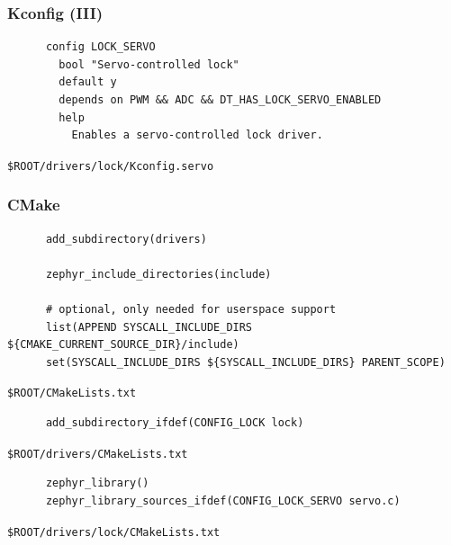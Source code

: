 \documentclass[handout]{beamer}
\begin{document}
\begin{frame}[fragile]
  \frametitle{Kconfig (III)}
  \begin{listing}[H]
    \begin{verbatim}
      config LOCK_SERVO
        bool "Servo-controlled lock"
        default y
        depends on PWM && ADC && DT_HAS_LOCK_SERVO_ENABLED
        help
          Enables a servo-controlled lock driver.

    \end{verbatim}
    \caption{\texttt{\$ROOT/drivers/lock/Kconfig.servo}}
  \end{listing}
\end{frame}

\begin{frame}[fragile]
  \frametitle{CMake}

  \begin{listing}[H]
    \begin{verbatim}
      add_subdirectory(drivers)

      zephyr_include_directories(include)

      # optional, only needed for userspace support
      list(APPEND SYSCALL_INCLUDE_DIRS ${CMAKE_CURRENT_SOURCE_DIR}/include)
      set(SYSCALL_INCLUDE_DIRS ${SYSCALL_INCLUDE_DIRS} PARENT_SCOPE)
    \end{verbatim}
    \caption{\texttt{\$ROOT/CMakeLists.txt}}
  \end{listing}

  \begin{listing}[H]
    \begin{verbatim}
      add_subdirectory_ifdef(CONFIG_LOCK lock)
    \end{verbatim}
    \caption{\texttt{\$ROOT/drivers/CMakeLists.txt}}
  \end{listing}

  \begin{listing}[H]
    \begin{verbatim}
      zephyr_library()
      zephyr_library_sources_ifdef(CONFIG_LOCK_SERVO servo.c)
    \end{verbatim}
    \caption{\texttt{\$ROOT/drivers/lock/CMakeLists.txt}}
  \end{listing}
\end{frame}
\end{document}
